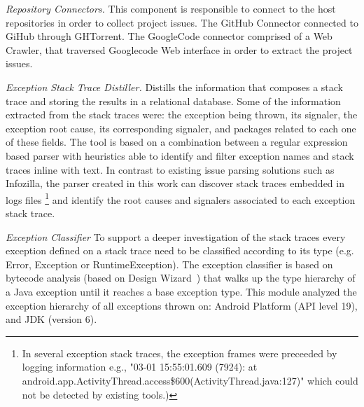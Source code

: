 \documentclass[conference]{IEEEtran}
\begin{document}
\noindent\emph{Repository Connectors.}  This component is responsible to connect to
 the host repositories in order to collect project issues. The GitHub Connector connected
 to GiHub through GHTorrent. The GoogleCode connector comprised of a Web Crawler,
 that traversed Googlecode Web interface in order to extract the project issues.

\noindent\emph{Exception Stack Trace Distiller.} 
Distills the information that composes a stack trace and storing the results in a
relational database. Some of the information extracted from the stack traces were:
 the exception being thrown, its signaler, the exception root cause, its corresponding signaler,
and packages related to each one of these fields.
The tool is based on a combination between a regular expression based parser 
with heuristics able to identify and filter exception names and stack traces inline with text. In
contrast to existing issue parsing solutions such as Infozilla, the parser
created in this work can discover stack traces embedded in logs files \footnote{In several 
exception stack traces, the exception frames were preceeded by logging information e.g., "03-01 15:55:01.609 (7924): at android.app.ActivityThread.access\$600(ActivityThread.java:127)" which could not be detected by existing tools.)}  
and identify the root causes and signalers associated to each exception stack trace.



\noindent\emph{Exception Classifier} To support a deeper investigation of the stack traces 
every exception defined on a stack trace need to be classified according to its type
(e.g. Error, Exception or RuntimeException). The exception classifier is based on 
bytecode analysis (based on Design Wizard~\cite{Brunet09}) that walks up the 
type hierarchy of a Java exception until it reaches a base exception type.
This module analyzed the exception hierarchy of all exceptions thrown on:
  Android Platform (API level 19), and JDK (version 6).
\end{document}
